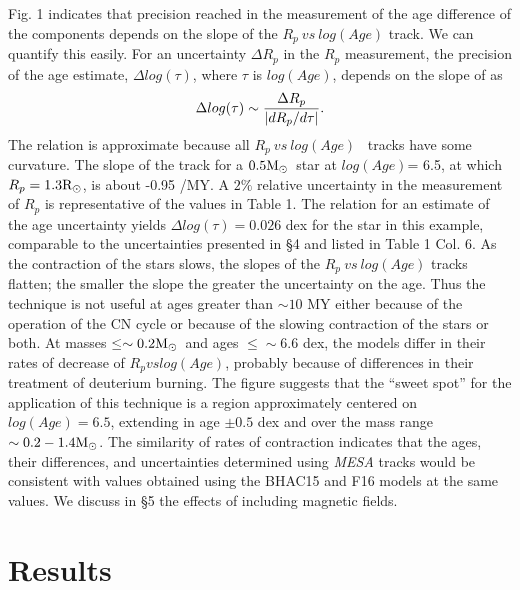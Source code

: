 \documentclass[12pt,preprint]{aastex6}
\begin{document}
Fig. 1 indicates that precision reached in the
measurement of the age difference of the 
components depends on the slope of the 
$R_p~vs~log(Age)$ track. We can quantify
this easily.  For an uncertainty 
$\Delta R_p$ in the  $R_p$ measurement, 
the precision of the age estimate, 
$\Delta log(\tau)$, where $\tau$ is $log(Age)$, 
depends on the slope of as 
$$\Delta log(\tau) \sim {\Delta R_p \over {|dR_p/d\tau|}}.$$
The relation is approximate because all $R_p~vs~log (Age)$~
tracks have some curvature.  The slope of the track
for a $0.5 \hbox{M$_\odot$}$~star at $log(Age)$= 6.5, at which
$R_p = 1.3 \hbox{R$_\odot$}$, is about -0.95 \rsun/MY.  A $2\%$ 
relative uncertainty in the measurement of $R_p$
is representative of the values in Table 1. The
relation for an estimate of the age uncertainty
yields $\Delta log(\tau) = 0.026$ dex for the
star in this example, comparable to the 
uncertainties presented in \S 4 and listed in Table 1 Col. 6.
As the contraction of the stars slows, the slopes
of the $R_p~vs~log(Age)$ tracks flatten; the 
smaller the slope the greater the uncertainty 
on the age.  Thus the technique is not useful at
ages greater than $\sim 10$ MY either because
of the operation of the CN cycle or because
of the slowing contraction of the stars or both.
At masses $\le \sim 0.2 \hbox{M$_\odot$}$~and ages $\le \sim
6.6$ dex, the models differ in their rates of
decrease of $R_p vs log(Age)$, probably because
of differences in their treatment of deuterium 
burning.  The figure suggests that the ``sweet spot'' 
for the application of this technique is a region
approximately centered on  $log(Age)=6.5$, extending
in age $\pm 0.5$ dex and over the mass range
$\sim 0.2 - 1.4 \hbox{M$_\odot$}$.  The similarity of rates 
of contraction indicates that the ages, their 
differences, and uncertainties determined 
using {\it MESA} tracks would be consistent 
with values obtained using the BHAC15 and F16 
models at the same values.  We discuss in 
\S 5 the effects of including magnetic fields.


\section{Results}
\end{document}
